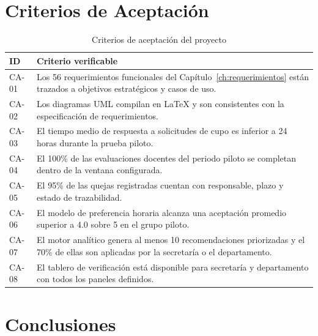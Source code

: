 \section{Criterios de Aceptación}

\begin{table}[H]
\centering
\caption{Criterios de aceptación del proyecto}
\label{tab:aceptacion}
\small
\begin{tabularx}{\textwidth}{@{}p{1.4cm} X@{}}
\toprule
\rowcolor{moradoClaro}
\textbf{ID} & \textbf{Criterio verificable} \\
\midrule
CA-01 & Los 56 requerimientos funcionales del Capítulo~\ref{ch:requerimientos}
  están trazados a objetivos estratégicos y casos de uso. \\
CA-02 & Los diagramas \ac{UML} compilan en \LaTeX{} y son consistentes con la
  especificación de requerimientos. \\
CA-03 & El tiempo medio de respuesta a solicitudes de cupo es inferior a 24 horas
  durante la prueba piloto. \\
CA-04 & El 100\% de las evaluaciones docentes del periodo piloto se completan
  dentro de la ventana configurada. \\
CA-05 & El 95\% de las quejas registradas cuentan con responsable, plazo y estado
  de trazabilidad. \\
CA-06 & El modelo de preferencia horaria alcanza una aceptación promedio superior
  a 4.0 sobre 5 en el grupo piloto. \\
CA-07 & El motor analítico genera al menos 10 recomendaciones priorizadas y el
  70\% de ellas son aplicadas por la secretaría o el departamento. \\
CA-08 & El tablero de verificación está disponible para secretaría y
  departamento con todos los paneles definidos. \\
\bottomrule
\end{tabularx}
\end{table}

\section{Conclusiones}

